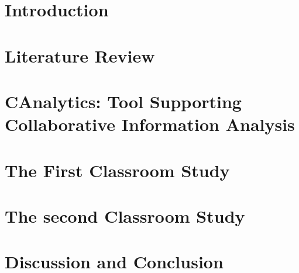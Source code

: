 \documentclass[11pt]{psuthesis}
\begin{document}


\chapter{Introduction}


\chapter{Literature Review}




\chapter{CAnalytics: Tool Supporting \\ Collaborative Information Analysis}






\chapter{The First Classroom Study}







\chapter{The second Classroom Study}






\chapter{Discussion and Conclusion}



\end{document}
